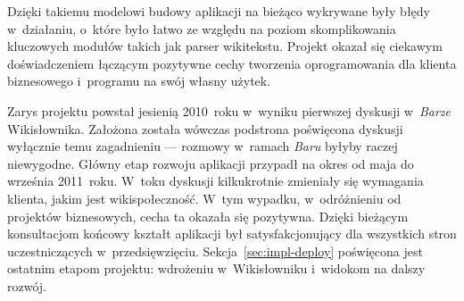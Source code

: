 Dzięki takiemu modelowi budowy aplikacji na bieżąco wykrywane były błędy w~działaniu, o~które było łatwo ze względu na poziom skomplikowania kluczowych modułów takich jak parser wikitekstu. Projekt okazał się ciekawym doświadczeniem łączącym pozytywne cechy tworzenia oprogramowania dla klienta biznesowego i~programu na swój własny użytek.

Zarys projektu powstał jesienią 2010~roku w~wyniku pierwszej dyskusji w~\emph{Barze} Wikisłownika. Założona została wówczas podstrona poświęcona dyskusji wyłącznie temu zagadnieniu --- rozmowy w~ramach \emph{Baru} byłyby raczej niewygodne. Główny etap rozwoju aplikacji przypadł na okres od maja do września 2011~roku. W~toku dyskusji kilkukrotnie zmieniały się wymagania klienta, jakim jest wikispołeczność. W~tym wypadku, w~odróżnieniu od projektów biznesowych, cecha ta okazała się pozytywna. Dzięki bieżącym konsultacjom końcowy kształt aplikacji był satysfakcjonujący dla wszystkich stron uczestniczących w~przedsięwzięciu. Sekcja~\ref{sec:impl-deploy} poświęcona jest ostatnim etapom projektu: wdrożeniu w~Wikisłowniku i~widokom na dalszy rozwój.
